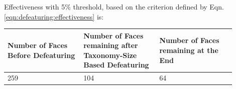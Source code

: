 


Effectiveness with 5\% threshold, based on the criterion defined by Eqn. \ref{eqn:defeaturing:effectiveness} is:

\begin{minipage}[c]{0.98\linewidth}
 \label{tbl_defeatdata}
\begin{longtable}[h]{@{} p{0.3\linewidth} |p{0.3\linewidth}| p{0.3\linewidth} @{}}\toprule
\textbf{Number of Faces Before Defeaturing } & \textbf{Number of Faces {remaining} after Taxonomy-Size Based Defeaturing} & \textbf{Number of Faces {remaining} at the End}\\  \midrule
259 & 104 & 64\\
\bottomrule
\end{longtable}

\end{minipage}

